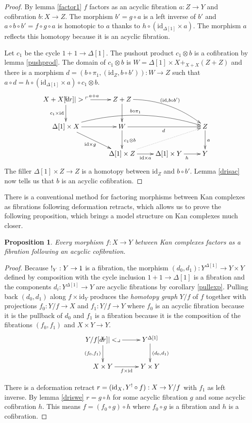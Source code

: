 \documentclass{amsart}
\theoremstyle{plain}
\newtheorem{prop}[theorem]{Proposition}
\theoremstyle{definition}
\newcommand\id{\mathrm{id}}
\begin{document}
\begin{proof} By lemma \ref{factor1} $f$ factors as an acyclic fibration $a:Z\to Y$ and cofibration $b:X\to Z$. The morphism $b' = g\circ a$ is a left inverse of $b'$ and $a\circ b\circ b' = f\circ g\circ a$ is homotopic to $a$ thanks to $h\circ(\id_{\Delta[1]}\times a)$. The morphism $a$ reflects this homotopy because it is an acyclic fibration.

Let $c_1$ be the cycle $1+1\to \Delta[1]$. The pushout product $c_1\otimes b$ is a cofibration by lemma \ref{pushprod}. The domain of $c_1\otimes b$ is $W=\Delta[1]\times X +_{X+X} (Z+Z)$ and there is a morphism $d=(b\circ\pi_1,(\id_Z,b\circ b')):W\to Z$ such that $a\circ d = h\circ (\id_{\Delta[1]}\times a)\circ c_1\otimes b$.
\[\xymatrix{
X+X\ar[r]^{a+a} \ar[d]_{c_1\times \id} \po & Z+Z\ar[d] \ar@/^3ex/[drr]^{(\id,b\circ b')} \\
\Delta[1]\times X \ar[r]\ar[dr]_{\id\times g}\ar@/^4ex/[rrr]^{b\circ\pi_1} & W \ar[rr]_d \ar[d]^{c_1\otimes b} && Z\ar[d]^a \\
& \Delta[1]\times Z \ar[r]_{\id\times a} \ar@{.>}[urr] & \Delta[1]\times Y \ar[r]_h & Y
}\]
The filler $\Delta[1]\times Z\to Z$ is a homotopy between $\id_Z$ and $b\circ b'$. Lemma \ref{drisac} now tells us that $b$ is an acyclic cofibration.
\end{proof}

There is a conventional method for factoring morphisms between Kan complexes as fibrations following deformation retracts, which allows us to prove the following proposition, which brings a model structure on Kan complexes much closer.

\begin{prop} Every morphism $f:X\to Y$ between Kan complexes factors as a fibration following an acyclic cofibration. \label{factor2} \end{prop}

\begin{proof} Because $!_Y:Y\to 1$ is a fibration, the morphism $(d_0,d_1):Y^{\Delta[1]} \to Y\times Y$ defined by composition with the cycle inclusion $1+1\to \Delta[1]$ is a fibration and the components $d_i:Y^{\Delta[1]}\to Y$ are acyclic fibrations by corollary \ref{pullexp}. Pulling back $(d_0,d_1)$ along $f\times \id_Y$ produces the \emph{homotopy graph} $Y/f$ of $f$ together with projections $f_0:Y/f\to X$ and $f_1:Y/f\to Y$ where $f_0$ is an acyclic fibration because it is the pullback of $d_0$ and $f_1$ is a fibration because it is the composition of the fibrations $(f_0,f_1)$ and $X\times Y\to Y$.
\[\xymatrix{
Y/f \ar[r]\ar[d]_{(f_0,f_1)} \pb & Y^{\Delta[1]} \ar[d]^{(d_0,d_1)} \\
X\times Y \ar[r]_{f\times\id} & Y\times Y
}\]

There is a deformation retract $r=(\id_X,Y^\bang\circ f):X\to Y/f$ with $f_1$ as left inverse. By lemma \ref{driswe} $r = g\circ h$ for some acyclic fibration $g$ and some acyclic cofibration $h$. This means $f = (f_0\circ g)\circ h$ where $f_0\circ g$ is a fibration and $h$ is a cofibration.
\end{proof}
\end{document}
